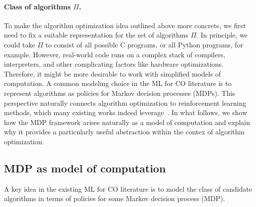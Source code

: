 \documentclass[a4paper]{report}
\theoremstyle{definition}
\theoremstyle{plain}
\begin{document}
\paragraph{Class of algorithms $\Pi$.}
To make the algorithm optimization idea outlined above more concrete, we first
need to fix a suitable representation for the set of algorithms $\Pi$. In
principle, we could take $\Pi$ to consist of all possible C programs, or all
Python programs, for example. However, real-world code runs on a complex stack
of compilers, interpreters, and other complicating factors like hardware
optimizations. Therefore, it might be more desirable to work with simplified
models of computation. A common modeling choice in the ML for CO literature is
to represent algorithms as policies for Markov decision processes (MDPs). This
perspective naturally connects algorithm optimization to reinforcement learning
methods, which many existing works indeed
leverage~\cite{mazyavkinaReinforcementLearningCombinatorial2020,daiLearningCombinatorialOptimization2018,koolAttentionLearnSolve2019}.
In what follows, we show how the MDP framework arises naturally as a model of
computation and explain why it provides a particularly useful abstraction within
the contex of algorithm optimization.

\subsection{MDP as model of computation}

A key idea in the existing ML for CO literature is to model the class of
candidate algorithms in terms of policies for some Markov decision process
(MDP).
\end{document}
